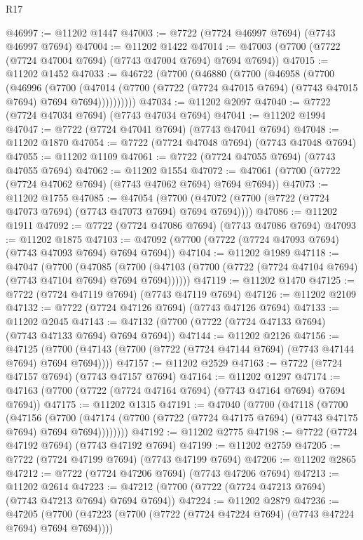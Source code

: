 \begin{lexlean}{R17}
\begin{coremodule}
@46997 := @11202 @1447
@47003 := @7722 (@7724 @46997 @7694) (@7743 @46997 @7694)
@47004 := @11202 @1422
@47014 := @47003 (@7700 (@7722 (@7724 @47004 @7694) (@7743 @47004 @7694) @7694 @7694))
@47015 := @11202 @1452
@47033 := @46722
    (@7700
      (@46880
        (@7700
          (@46958
            (@7700
              (@46996
                (@7700
                  (@47014
                    (@7700 (@7722 (@7724 @47015 @7694) (@7743 @47015 @7694) @7694 @7694))))))))))
@47034 := @11202 @2097
@47040 := @7722 (@7724 @47034 @7694) (@7743 @47034 @7694)
@47041 := @11202 @1994
@47047 := @7722 (@7724 @47041 @7694) (@7743 @47041 @7694)
@47048 := @11202 @1870
@47054 := @7722 (@7724 @47048 @7694) (@7743 @47048 @7694)
@47055 := @11202 @1109
@47061 := @7722 (@7724 @47055 @7694) (@7743 @47055 @7694)
@47062 := @11202 @1554
@47072 := @47061 (@7700 (@7722 (@7724 @47062 @7694) (@7743 @47062 @7694) @7694 @7694))
@47073 := @11202 @1755
@47085 := @47054
    (@7700 (@47072 (@7700 (@7722 (@7724 @47073 @7694) (@7743 @47073 @7694) @7694 @7694))))
@47086 := @11202 @1911
@47092 := @7722 (@7724 @47086 @7694) (@7743 @47086 @7694)
@47093 := @11202 @1875
@47103 := @47092 (@7700 (@7722 (@7724 @47093 @7694) (@7743 @47093 @7694) @7694 @7694))
@47104 := @11202 @1989
@47118 := @47047
    (@7700
      (@47085
        (@7700 (@47103 (@7700 (@7722 (@7724 @47104 @7694) (@7743 @47104 @7694) @7694 @7694))))))
@47119 := @11202 @1470
@47125 := @7722 (@7724 @47119 @7694) (@7743 @47119 @7694)
@47126 := @11202 @2109
@47132 := @7722 (@7724 @47126 @7694) (@7743 @47126 @7694)
@47133 := @11202 @2045
@47143 := @47132 (@7700 (@7722 (@7724 @47133 @7694) (@7743 @47133 @7694) @7694 @7694))
@47144 := @11202 @2126
@47156 := @47125
    (@7700 (@47143 (@7700 (@7722 (@7724 @47144 @7694) (@7743 @47144 @7694) @7694 @7694))))
@47157 := @11202 @2529
@47163 := @7722 (@7724 @47157 @7694) (@7743 @47157 @7694)
@47164 := @11202 @1297
@47174 := @47163 (@7700 (@7722 (@7724 @47164 @7694) (@7743 @47164 @7694) @7694 @7694))
@47175 := @11202 @1315
@47191 := @47040
    (@7700
      (@47118
        (@7700
          (@47156
            (@7700
              (@47174 (@7700 (@7722 (@7724 @47175 @7694) (@7743 @47175 @7694) @7694 @7694))))))))
@47192 := @11202 @2775
@47198 := @7722 (@7724 @47192 @7694) (@7743 @47192 @7694)
@47199 := @11202 @2759
@47205 := @7722 (@7724 @47199 @7694) (@7743 @47199 @7694)
@47206 := @11202 @2865
@47212 := @7722 (@7724 @47206 @7694) (@7743 @47206 @7694)
@47213 := @11202 @2614
@47223 := @47212 (@7700 (@7722 (@7724 @47213 @7694) (@7743 @47213 @7694) @7694 @7694))
@47224 := @11202 @2879
@47236 := @47205
    (@7700 (@47223 (@7700 (@7722 (@7724 @47224 @7694) (@7743 @47224 @7694) @7694 @7694))))

\end{coremodule}
\end{lexlean}
